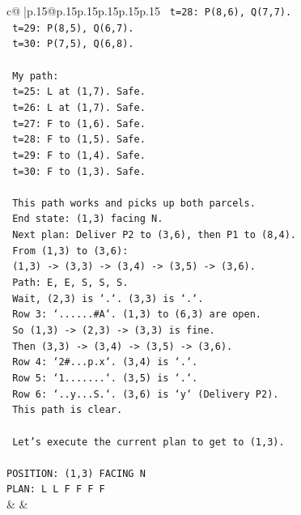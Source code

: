 \documentclass{article}
\begin{document}
{\begin{supertabular}{c@{$\;$}|p{.15\linewidth}@{}p{.15\linewidth}p{.15\linewidth}p{.15\linewidth}p{.15\linewidth}p{.15\linewidth}}
{{{\texttt{   t=28: P(8,6), Q(7,7).} \\
\texttt{   t=29: P(8,5), Q(6,7).} \\
\texttt{   t=30: P(7,5), Q(6,8).} \\
\\ 
\texttt{   My path:} \\
\texttt{   t=25: L at (1,7). Safe.} \\
\texttt{   t=26: L at (1,7). Safe.} \\
\texttt{   t=27: F to (1,6). Safe.} \\
\texttt{   t=28: F to (1,5). Safe.} \\
\texttt{   t=29: F to (1,4). Safe.} \\
\texttt{   t=30: F to (1,3). Safe.} \\
\\ 
\texttt{   This path works and picks up both parcels.} \\
\texttt{   End state: (1,3) facing N.} \\
\texttt{   Next plan: Deliver P2 to (3,6), then P1 to (8,4).} \\
\texttt{   From (1,3) to (3,6):} \\
\texttt{   (1,3) {-}> (3,3) {-}> (3,4) {-}> (3,5) {-}> (3,6).} \\
\texttt{   Path: E, E, S, S, S.} \\
\texttt{   Wait, (2,3) is `.`. (3,3) is `.`.} \\
\texttt{   Row 3: `......\#A`. (1,3) to (6,3) are open.} \\
\texttt{   So (1,3) {-}> (2,3) {-}> (3,3) is fine.} \\
\texttt{   Then (3,3) {-}> (3,4) {-}> (3,5) {-}> (3,6).} \\
\texttt{   Row 4: `2\#...p.x`. (3,4) is `.`.} \\
\texttt{   Row 5: `1.......`. (3,5) is `.`.} \\
\texttt{   Row 6: `..y...S.`. (3,6) is `y` (Delivery P2).} \\
\texttt{   This path is clear.} \\
\\ 
\texttt{   Let's execute the current plan to get to (1,3).} \\
\\ 
\texttt{POSITION: (1,3) FACING N} \\
\texttt{PLAN: L L F F F F} \\
            }
        }
    }
    & & \\ \\


\end{supertabular}}
\end{document}
